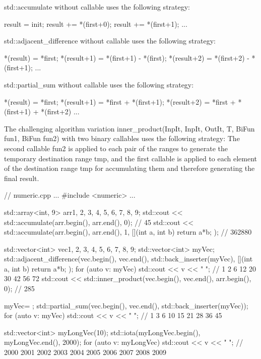 std::accumulate without callable uses the following strategy:

\begin{cpp}
result = init;
result += *(first+0);
result += *(first+1);
...
\end{cpp}

std::adjacent\_difference without callable uses the following strategy:

\begin{cpp}
*(result) = *first;
*(result+1) = *(first+1) - *(first);
*(result+2) = *(first+2) - *(first+1);
...
\end{cpp}

std::partial\_sum without callable uses the following strategy:

\begin{cpp}
*(result) = *first;
*(result+1) = *first + *(first+1);
*(result+2) = *first + *(first+1) + *(first+2)
...
\end{cpp}

The challenging algorithm variation inner\_product(InpIt, InpIt, OutIt, T, BiFun fun1, BiFun fun2) with two binary callables uses the following strategy: The second callable fun2 is applied to each pair of the ranges to generate the temporary destination range tmp, and the first callable is applied to each element of the destination range tmp for accumulating them and therefore generating the final result.


\begin{cpp}
// numeric.cpp
...
#include <numeric>
...

std::array<int, 9> arr{1, 2, 3, 4, 5, 6, 7, 8, 9};
std::cout << std::accumulate(arr.begin(), arr.end(), 0); // 45
std::cout << std::accumulate(arr.begin(), arr.end(), 1,
							 [](int a, int b){ return a*b; } ); // 362880

std::vector<int> vec{1, 2, 3, 4, 5, 6, 7, 8, 9};
std::vector<int> myVec;
std::adjacent_difference(vec.begin(), vec.end(),
				std::back_inserter(myVec), [](int a, int b){ return a*b; });
for (auto v: myVec) std::cout << v << " "; // 1 2 6 12 20 30 42 56 72
std::cout << std::inner_product(vec.begin(), vec.end(), arr.begin(), 0); // 285

myVec= {};
std::partial_sum(vec.begin(), vec.end(), std::back_inserter(myVec));
for (auto v: myVec) std::cout << v << " "; // 1 3 6 10 15 21 28 36 45

std::vector<int> myLongVec(10);
std::iota(myLongVec.begin(), myLongVec.end(), 2000);
for (auto v: myLongVec) std::cout << v << " ";
						// 2000 2001 2002 2003 2004 2005 2006 2007 2008 2009
\end{cpp}

